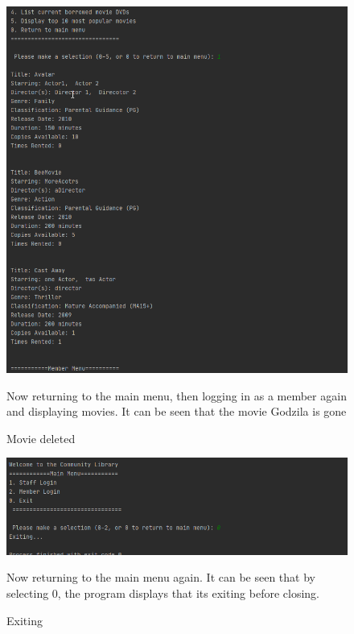 \documentclass[a4paper,12pt]{article}
\begin{document}
\begin{figure}[!htb]
\centering
\includegraphics[width=1\textwidth]{13}
\caption{Movie deleted}
\medskip
\small
Now returning to the main menu, then logging in as a member again and displaying movies. It can be seen that the movie Godzila is gone
\end{figure}


\begin{figure}[!htb]
\centering
\includegraphics[width=1\textwidth]{14}
\caption{Exiting}
\medskip
\small
Now returning to the main menu again. It can be seen that by selecting 0, the program displays that its exiting before closing.
\end{figure}
\end{document}
